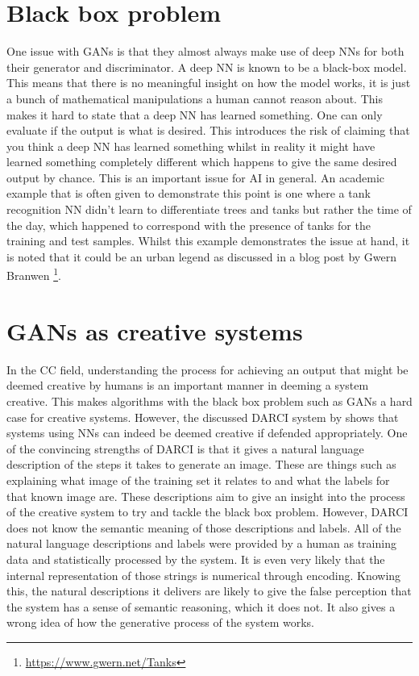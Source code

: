 \section{Black box problem}
\label{sec:back_box_problem}

One issue with GANs is that they almost always make use of deep NNs for both their generator and discriminator.
A deep NN is known to be a black-box model.
This means that there is no meaningful insight on how the model works, it is just a bunch of mathematical manipulations a human cannot reason about.
This makes it hard to state that a deep NN has learned something.
One can only evaluate if the output is what is desired.
This introduces the risk of claiming that you think a deep NN has learned something whilst in reality it might have learned something completely different which happens to give the same desired output by chance.
This is an important issue for AI in general.
An academic example that is often given to demonstrate this point is one where a tank recognition NN didn't learn to differentiate trees and tanks but rather the time of the day, which happened to correspond with the presence of tanks for the training and test samples.
Whilst this example demonstrates the issue at hand, it is noted that it could be an urban legend as discussed in a blog post by Gwern Branwen \footnote{\url{https://www.gwern.net/Tanks}}.


\section{GANs as creative systems}
\label{sec:GAN_as_creative}

In the CC field, understanding the process for achieving an output that might be deemed creative by humans is an important manner in deeming a system creative.
This makes algorithms with the black box problem such as GANs a hard case for creative systems.
However, the discussed DARCI system by \citet{darci} shows that systems using NNs can indeed be deemed creative if defended appropriately.
One of the convincing strengths of DARCI is that it gives a natural language description of the steps it takes to generate an image.
These are things such as explaining what image of the training set it relates to and what the labels for that known image are.
These descriptions aim to give an insight into the process of the creative system to try and tackle the black box problem.
However, DARCI does not know the semantic meaning of those descriptions and labels.
All of the natural language descriptions and labels were provided by a human as training data and statistically processed by the system.
It is even very likely that the internal representation of those strings is numerical through encoding.
Knowing this, the natural descriptions it delivers are likely to give the false perception that the system has a sense of semantic reasoning, which it does not.
It also gives a wrong idea of how the generative process of the system works.

